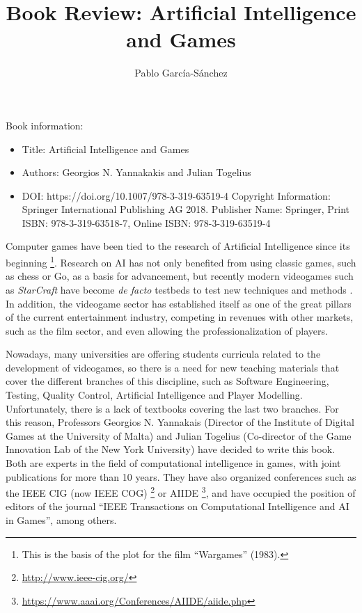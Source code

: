 \documentclass{article}
\begin{document}
\title{Book Review: Artificial Intelligence and Games}
\author[1]{Pablo Garc\'ia-S\'anchez}
\date{}                     %
\setcounter{Maxaffil}{0}
\renewcommand\Affilfont{\itshape\small}


\maketitle

Book information:
\begin{itemize}
\item Title: Artificial Intelligence and Games
\item Authors: Georgios N. Yannakakis and Julian Togelius
\item DOI: https://doi.org/10.1007/978-3-319-63519-4 Copyright Information: Springer International Publishing AG 2018. Publisher Name: Springer, Print ISBN: 978-3-319-63518-7, Online ISBN: 978-3-319-63519-4 
\end{itemize}

Computer games have been tied to the research of Artificial Intelligence since its beginning \footnote{This is the basis of the plot for the film ``Wargames'' (1983).}.  Research on AI has not only benefited from using classic games, such as chess or Go, as a basis for advancement, but recently modern videogames such as {\em StarCraft} have become {\em de facto} testbeds to test new techniques and methods \cite{Ontanon13Survey}. In addition, the videogame sector has established itself as one of the great pillars of the current entertainment industry, competing in revenues with other markets, such as the film sector, and even allowing the professionalization of players.

Nowadays, many universities are offering students curricula related to the development of videogames, so there is a need for new teaching materials that cover the different branches of this discipline, such as Software Engineering, Testing, Quality Control, Artificial Intelligence and Player Modelling. Unfortunately, there is a lack of textbooks covering the last two branches.  For this reason, Professors Georgios N. Yannakais (Director of the Institute of Digital Games at the University of Malta) and Julian Togelius (Co-director of the Game Innovation Lab of the New York University) have decided to write this book. Both are experts in the field of computational intelligence in games, with joint publications for more than 10 years. They have also organized conferences such as the IEEE CIG (now IEEE COG) \footnote{\url{http://www.ieee-cig.org/}} or AIIDE \footnote{\url{https://www.aaai.org/Conferences/AIIDE/aiide.php}}, and have occupied the position of editors of the journal  ``IEEE Transactions on Computational Intelligence and AI in Games'', among others.
\end{document}
